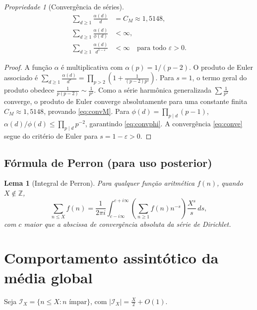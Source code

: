 \documentclass[12pt]{article}
\newtheorem{lema}[teorema]{Lema}
\theoremstyle{definition}
\theoremstyle{remark}
\newtheorem{propriedade}[teorema]{Propriedade}
\newcommand{\Ix}{\mathcal{I}_X}
\begin{document}
	\begin{propriedade}[Convergência de séries]\label{prop:conv}
		\begin{align}
			\sum_{d\ge 1}\frac{\alpha(d)}{d}
			&= C_M \approx 1{,}5148,\label{eq:convM}\\
			\sum_{d\ge1}\frac{\alpha(d)}{\phi(d)}
			&<\infty,\label{eq:convphi}\\
			\sum_{d\ge1}\frac{\alpha(d)}{d^{1-\varepsilon}}
			&<\infty\quad\text{para todo }\varepsilon>0.\label{eq:conve}
		\end{align}
	\end{propriedade}
	\begin{proof}
		A função $\alpha$ é multiplicativa com $\alpha(p)=1/(p-2)$.
		O produto de Euler associado é
		$\displaystyle\sum_{d\ge1}\frac{\alpha(d)}{d^s}=
		\prod_{p>2}\!\left(1+\frac{1}{(p-2)p^s}\right)$.
		Para $s=1$, o termo geral do produto obedece $\frac{1}{p(p-2)} \sim \frac{1}{p^2}$.
		Como a série harmônica generalizada $\sum \frac{1}{p^2}$ converge, o produto de Euler 
		converge absolutamente para uma constante finita $C_M \approx 1{,}5148$, provando \eqref{eq:convM}.
		Para $\phi(d)=\prod_{p\mid d}(p-1)$, $\alpha(d)/\phi(d)\le\prod_{p\mid d}p^{-2}$, 
		garantindo \eqref{eq:convphi}.
		A convergência \eqref{eq:conve} segue do critério de Euler para $s=1-\varepsilon>0$.
	\end{proof}
	
	\subsection{Fórmula de Perron (para uso posterior)}
	
	\begin{lema}[Integral de Perron]
		Para qualquer função aritmética $f(n)$, quando $X\notin\mathbb{Z}$,
		\[
		\sum_{n\le X}f(n)
		=\frac{1}{2\pi i}\int_{c-i\infty}^{c+i\infty}
		\left(\sum_{n\ge1}f(n)n^{-s}\right)\frac{X^s}{s}\,ds,
		\]
		com $c$ maior que a abscissa de convergência absoluta da série de
		Dirichlet.
	\end{lema}
	
	\section{Comportamento assintótico da média global}
	\label{sec:global}
	
	Seja $\Ix=\{n\le X : n\text{ ímpar}\}$, com $|\Ix|=\tfrac{X}{2}+O(1)$.
	
\end{document}
